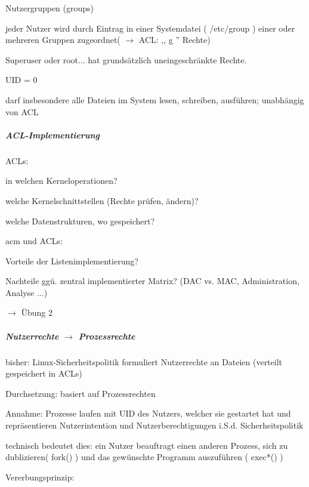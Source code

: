 \documentclass[a4paper]{article}
\begin{document}
\begin{multicols}{3}
    Nutzergruppen (groups)

    \begin{itemize*}
        \item
        jeder Nutzer wird durch Eintrag in einer Systemdatei ( /etc/group )
        einer oder mehreren Gruppen zugeordnet( $\rightarrow$
        ACL: ,, g '' Rechte)
    \end{itemize*}

    Superuser oder root... hat grundsätzlich uneingeschränkte Rechte.

    \begin{itemize*}
        \item
        UID = 0
        \item
        darf insbesondere alle Dateien im System lesen, schreiben, ausführen;
        unabhängig von ACL
    \end{itemize*}


    \subparagraph{ACL-Implementierung}

    \begin{itemize*}
        \item
        ACLs:
        \begin{itemize*}
            \item in welchen Kerneloperationen?
            \item welche Kernelschnittstellen (Rechte prüfen, ändern)?
            \item welche Datenstrukturen, wo gespeichert?
        \end{itemize*}
        \item
        acm und ACLs:
        \begin{itemize*}
            \item Vorteile der Listenimplementierung?
            \item Nachteile ggü. zentral implementierter Matrix? (DAC vs. MAC, Administration, Analyse ...)
        \end{itemize*}
        \item
        $\rightarrow$ Übung 2
    \end{itemize*}


    \subparagraph{Nutzerrechte $\rightarrow$
        Prozessrechte}

    bisher: Linux-Sicherheitspolitik formuliert Nutzerrechte an Dateien
    (verteilt gespeichert in ACLs)

    Durchsetzung: basiert auf Prozessrechten

    \begin{itemize*}
        \item
        Annahme: Prozesse laufen mit UID des Nutzers, welcher sie gestartet
        hat und repräsentieren Nutzerintention und Nutzerberechtigungen i.S.d.
        Sicherheitspolitik
        \item
        technisch bedeutet dies: ein Nutzer beauftragt einen anderen Prozess,
        sich zu dublizieren( fork() ) und das gewünschte Programm auszuführen
        ( exec*() )
        \item
        Vererbungsprinzip:
    \end{itemize*}



\end{multicols}
\end{document}
